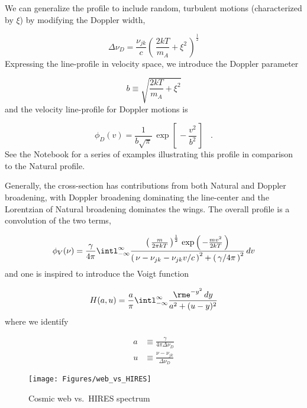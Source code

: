 \documentclass[graybox]{svmult}
\def\ohf{\frac{1}{2}}
\def\ltk{\left [ \,}
\def\ltp{\left ( \,}
\def\rtk{\, \right  ] }
\def\rtp{\, \right  ) }
\def\perd{\;\;\; .}
\begin{document}
We can generalize the profile to include random, turbulent
motions (characterized by $\xi$)
by modifying the Doppler width,

\begin{equation}
\Delta\nu_D = \frac{\nu_{jk}}{c} \ltp \frac{2kT}{m_A} + 
\xi^2 \rtp^\ohf
\end{equation}
Expressing the line-profile in velocity space, we introduce
the Doppler parameter

\begin{equation}
b \equiv \sqrt{\frac{2kT}{m_A} + \xi^2}
\end{equation}
and the velocity line-profile for Doppler motions is

\begin{equation}
\phi_D(v) = \frac{1}{b\sqrt{\pi}} \, \exp \ltk -\frac{v^2}{b^2} \rtk \perd
\label{eqn:phi_Dv}
\end{equation}
See the Notebook for a series of examples illustrating this
profile in comparison to the Natural profile.


Generally, the cross-section has contributions from both
Natural and Doppler broadening,
with Doppler broadening dominating the line-center 
and the Lorentzian of Natural broadening dominates the wings.
The overall profile is a convolution of the two terms,

\begin{equation}
\phi_V(\nu) = \frac{\gamma}{4\pi} \intl_{-\infty}^\infty
\frac{ \ltp \frac{m}{2\pi kT} \rtp^\ohf \, \exp \ltp - \frac{mv^2}{2kT} \rtp}
{\ltp \nu-\nu_{jk}-\nu_{jk}v/c \rtp^2 + \ltp \gamma/4\pi \rtp^2} \, dv
\end{equation}
and one is inspired to introduce the Voigt function

\begin{equation}
H(a,u) = \frac{a}{\pi} \intl_{-\infty}^\infty 
\frac{\rme^{-y^2} \, dy}{a^2 + (u-y)^2}
\end{equation}
where we identify

\begin{align}
a &\equiv \frac{\gamma}{4\pi \Delta\nu_D} \\
u &\equiv \frac{\nu-\nu_{jk}}{\Delta\nu_D}
\end{align}

%
\begin{figure}[b]
\sidecaption
\texttt{[image: Figures/web\_vs\_HIRES]}
%
%
\caption{Cosmic web vs.\ HIRES spectrum
}
\label{fig:web_vs_HIRES}       %
\end{figure}
\end{document}
